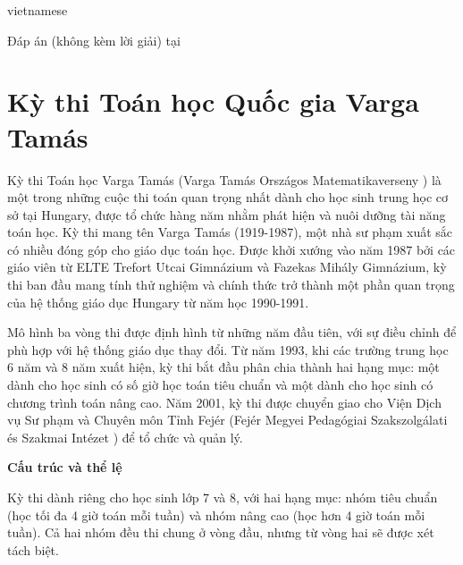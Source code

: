 \documentclass{article}
\begin{document}
\begin{otherlanguage*}{vietnamese}
\begin{remark*}
    Đáp án (không kèm lời giải) tại \cite{zrinyi_mo}
\end{remark*}

\newpage

\section{Kỳ thi Toán học Quốc gia Varga Tamás}

Kỳ thi Toán học Varga Tamás (Varga Tamás Országos Matematikaverseny \cite{VargaTamas}) là một trong những cuộc thi toán quan trọng nhất dành cho học sinh trung học cơ sở tại Hungary,
được tổ chức hàng năm nhằm phát hiện và nuôi dưỡng tài năng toán học. Kỳ thi mang tên Varga Tamás (1919-1987), một nhà sư phạm xuất sắc có nhiều đóng góp cho giáo dục toán học.
Được khởi xướng vào năm 1987 bởi các giáo viên từ ELTE Trefort Utcai Gimnázium và Fazekas Mihály Gimnázium,
kỳ thi ban đầu mang tính thử nghiệm và chính thức trở thành một phần quan trọng của hệ thống giáo dục Hungary từ năm học 1990-1991.

Mô hình ba vòng thi được định hình từ những năm đầu tiên, với sự điều chỉnh để phù hợp với hệ thống giáo dục thay đổi.
Từ năm 1993, khi các trường trung học 6 năm và 8 năm xuất hiện, kỳ thi bắt đầu phân chia thành hai hạng mục:
một dành cho học sinh có số giờ học toán tiêu chuẩn và một dành cho học sinh có chương trình toán nâng cao.
Năm 2001, kỳ thi được chuyển giao cho Viện Dịch vụ Sư phạm và Chuyên môn Tỉnh Fejér (Fejér Megyei Pedagógiai Szakszolgálati és Szakmai Intézet \cite{FMPDSzSzI}) để tổ chức và quản lý.

\textbf{Cấu trúc và thể lệ}

Kỳ thi dành riêng cho học sinh lớp 7 và 8, với hai hạng mục: nhóm tiêu chuẩn (học tối đa 4 giờ toán mỗi tuần) và nhóm nâng cao (học hơn 4 giờ toán mỗi tuần).
Cả hai nhóm đều thi chung ở vòng đầu, nhưng từ vòng hai sẽ được xét tách biệt.


\end{otherlanguage*}
\end{document}
